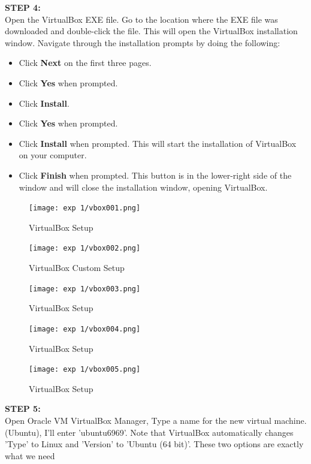 \documentclass[12pt]{article}
\begin{document}
\begin{spacing}{1.5}
\begin{adjustwidth}{0cm}{0cm}
\begin{justify}
\textbf{STEP 4:} \\
Open the VirtualBox EXE file. Go to the location where the EXE file was downloaded and double-click the file. This will open the VirtualBox installation window. 
Navigate through the installation prompts by doing the following:

\begin{itemize}
    \item Click \textbf{Next} on the first three pages.
    \item Click \textbf{Yes} when prompted.
    \item Click \textbf{Install}.
    \item Click \textbf{Yes} when prompted.
    \item Click \textbf{Install} when prompted. This will start the installation of VirtualBox on your computer.
    \item Click \textbf{Finish} when prompted. This button is in the lower-right side of the window and will close the installation window, opening VirtualBox.
\end{itemize}

\begin{figure}[H]
    \centering
    \texttt{[image: exp 1/vbox001.png]}
    \caption{VirtualBox Setup}
    \label{fig: 1}
\end{figure}

\begin{figure}[H]
    \centering
    \texttt{[image: exp 1/vbox002.png]}
    \caption{VirtualBox Custom Setup}
    \label{fig: 1}
\end{figure}

\begin{figure}[H]
    \centering
    \texttt{[image: exp 1/vbox003.png]}
    \caption{VirtualBox Setup}
    \label{fig: 1}
\end{figure}

\begin{figure}[H]
    \centering
    \texttt{[image: exp 1/vbox004.png]}
    \caption{VirtualBox Setup}
    \label{fig: 1}
\end{figure}

\begin{figure}[H]
    \centering
    \texttt{[image: exp 1/vbox005.png]}
    \caption{VirtualBox Setup}
    \label{fig: 1}
\end{figure}


\textbf{STEP 5:} \\
Open Oracle VM VirtualBox Manager, Type a name for the new virtual machine. (Ubuntu), I'll enter 'ubuntu6969'. Note that VirtualBox automatically changes 'Type' to Linux and 'Version' to 'Ubuntu (64 bit)'. These two options are exactly what we need


\end{justify}
\end{adjustwidth}
\end{spacing}
\end{document}
